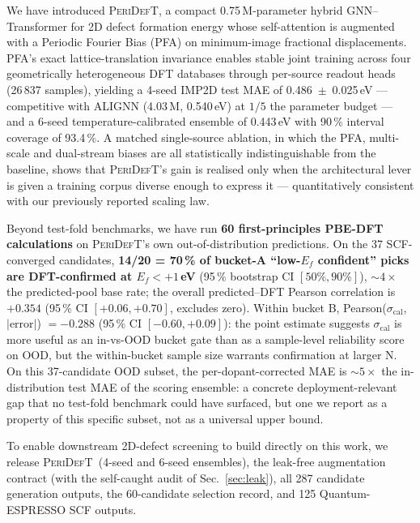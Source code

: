 \documentclass[11pt,a4paper]{article}
\newcommand{\modelname}{\textsc{PeriDefT}}
\begin{document}
We have introduced \modelname, a compact 0.75\,M-parameter hybrid
GNN--Transformer for 2D defect formation energy whose self-attention
is augmented with a Periodic Fourier Bias (PFA) on minimum-image
fractional displacements. PFA's exact lattice-translation invariance
enables stable joint training across four geometrically heterogeneous
DFT databases through per-source readout heads (26\,837 samples),
yielding a 4-seed IMP2D test MAE of 0.486~$\pm$~0.025\,eV ---
competitive with ALIGNN (4.03\,M, 0.540\,eV) at $1/5$ the parameter
budget --- and a 6-seed temperature-calibrated ensemble of 0.443\,eV
with 90\,\% interval coverage of 93.4\,\%. A matched single-source
ablation, in which the PFA, multi-scale and dual-stream biases are
all statistically indistinguishable from the baseline, shows that
\modelname's gain is realised only when the architectural lever is
given a training corpus diverse enough to express it ---
quantitatively consistent with our previously reported scaling law.

Beyond test-fold benchmarks, we have run \textbf{60 first-principles
PBE-DFT calculations} on \modelname's own out-of-distribution
predictions. On the 37 SCF-converged candidates,
\textbf{14/20 = 70\,\% of bucket-A ``low-$E_f$ confident'' picks
are DFT-confirmed at $E_f < +1$\,eV} (95\,\% bootstrap CI
$[50\%, 90\%]$), $\sim 4\times$ the predicted-pool base rate; the
overall predicted--DFT Pearson correlation is $+0.354$ (95\,\% CI
$[+0.06, +0.70]$, excludes zero). Within bucket B,
Pearson($\sigma_{\mathrm{cal}}$, $|\mathrm{error}|$) $= -0.288$
(95\,\% CI $[-0.60, +0.09]$): the point estimate suggests
$\sigma_{\mathrm{cal}}$ is more useful as an in-vs-OOD bucket gate
than as a sample-level reliability score on OOD, but the within-bucket
sample size warrants confirmation at larger N. On this 37-candidate
OOD subset, the per-dopant-corrected MAE is $\sim 5\times$ the
in-distribution test MAE of the scoring ensemble: a concrete
deployment-relevant gap that
no test-fold benchmark could have surfaced, but one we report as a
property of this specific subset, not as a universal upper bound.

To enable downstream 2D-defect screening to build directly on this
work, we release \modelname\ (4-seed and 6-seed ensembles), the
leak-free augmentation contract (with the self-caught audit of
Sec.~\ref{sec:leak}), all 287 candidate generation outputs, the
60-candidate selection record, and 125 Quantum-ESPRESSO SCF outputs.

\end{document}

